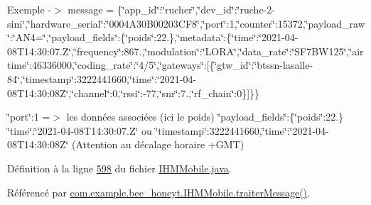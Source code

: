 Exemple -\/$>$ message = \{\char`\"{}app\+\_\+id\char`\"{}\+:\char`\"{}rucher\char`\"{},\char`\"{}dev\+\_\+id\char`\"{}\+:\char`\"{}ruche-\/2-\/sim\char`\"{},\char`\"{}hardware\+\_\+serial\char`\"{}\+:\char`\"{}0004\+A30\+B00203\+C\+F8\char`\"{},\char`\"{}port\char`\"{}\+:1,\char`\"{}counter\char`\"{}\+:15372,\char`\"{}payload\+\_\+raw\char`\"{}\+:\char`\"{}\+A\+N4=\char`\"{},\char`\"{}payload\+\_\+fields\char`\"{}\+:\{\char`\"{}poids\char`\"{}\+:22.\},\char`\"{}metadata\char`\"{}\+:\{\char`\"{}time\char`\"{}\+:\char`\"{}2021-\/04-\/08\+T14\+:30\+:07.\+Z\char`\"{},\char`\"{}frequency\char`\"{}\+:867.,\char`\"{}modulation\char`\"{}\+:\char`\"{}\+L\+O\+R\+A\char`\"{},\char`\"{}data\+\_\+rate\char`\"{}\+:\char`\"{}\+S\+F7\+B\+W125\char`\"{},\char`\"{}airtime\char`\"{}\+:46336000,\char`\"{}coding\+\_\+rate\char`\"{}\+:\char`\"{}4/5\char`\"{},\char`\"{}gateways\char`\"{}\+:\mbox{[}\{\char`\"{}gtw\+\_\+id\char`\"{}\+:\char`\"{}btssn-\/lasalle-\/84\char`\"{},\char`\"{}timestamp\char`\"{}\+:3222441660,\char`\"{}time\char`\"{}\+:\char`\"{}2021-\/04-\/08\+T14\+:30\+:08\+Z\char`\"{},\char`\"{}channel\char`\"{}\+:0,\char`\"{}rssi\char`\"{}\+:-\/77,\char`\"{}snr\char`\"{}\+:7.,\char`\"{}rf\+\_\+chain\char`\"{}\+:0\}\mbox{]}\}\}

\char`\"{}port\char`\"{}\+:1 =$>$ les données associées (ici le poids) \char`\"{}payload\+\_\+fields\char`\"{}\+:\{\char`\"{}poids\char`\"{}\+:22.\} \char`\"{}time\char`\"{}\+:\char`\"{}2021-\/04-\/08\+T14\+:30\+:07.\+Z\char`\"{} ou \char`\"{}timestamp\char`\"{}\+:3222441660,\char`\"{}time\char`\"{}\+:\char`\"{}2021-\/04-\/08\+T14\+:30\+:08\+Z\char`\"{} (Attention au décalage horaire +\+G\+MT)

Définition à la ligne \hyperlink{_i_h_m_mobile_8java_source_l00598}{598} du fichier \hyperlink{_i_h_m_mobile_8java_source}{I\+H\+M\+Mobile.\+java}.



Référencé par \hyperlink{_i_h_m_mobile_8java_source_l00374}{com.\+example.\+bee\+\_\+honeyt.\+I\+H\+M\+Mobile.\+traiter\+Message()}.


